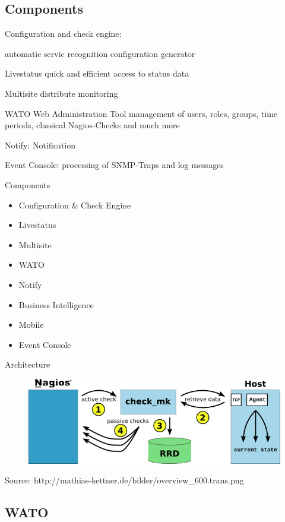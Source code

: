 \subsection{Components}

Configuration and check engine:

automatic servic recognition
configuration generator

Livestatus
quick and efficient access to status data

Multisite
distribute monitoring

WATO
Web Administration Tool
management of users, roles, groups, time periods, 
classical Nagios-Checks and much more

Notify:
Notification

Event Console:
processing of SNMP-Traps and log messages

\begin{frame}[fragile]{Components}
\begin{itemize}
\item Configuration \& Check Engine
\item Livestatus
\item Multisite
\item WATO
\item Notify
\item Business Intelligence
\item Mobile
\item Event Console
\end{itemize}
\end{frame}

\begin{frame}{Architecture}
\begin{figure}
\includegraphics[width=\textwidth]{images/overview_600_trans.png}
\end{figure}
Source: http://mathias-kettner.de/bilder/overview\_600.trans.png
\end{frame}

\subsection{WATO}

